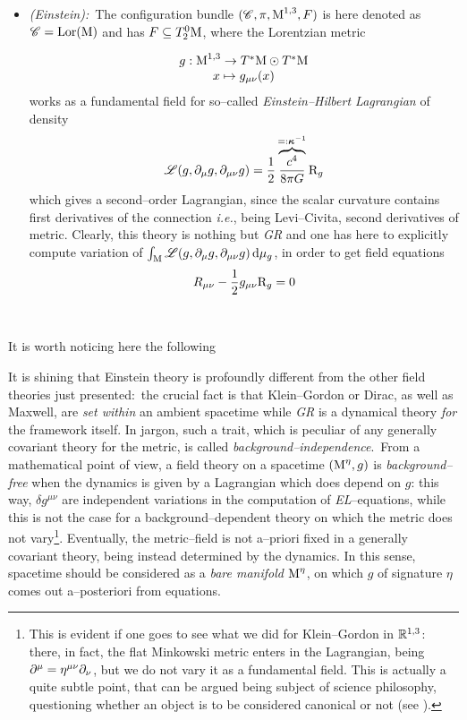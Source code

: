 \begin{example}
\begin{itemize}
        \item \emph{(Einstein):}\, The configuration bundle $(\mathscr{C},\pi,\text{\normalfont M}^{1,3},F)$ is here denoted as $\mathscr{C}=\text{\normalfont Lor}(\text{\normalfont M})$ and has $F\subseteq T^0_2\text{\normalfont M}$, where the Lorentzian metric

        $$\begin{matrix}
            g:\text{\normalfont M}^{1,3}\to T^*\text{\normalfont M}\odot T^*\text{\normalfont M}\\
            x\mapsto g_{\mu\nu}(x)
        \end{matrix}$$
        works as a fundamental field for so--called \emph{Einstein--Hilbert Lagrangian} of density
        $$\mathscr{L}(g,\partial_\mu g,\partial_{\mu\nu}g)=\frac{1}{2}\overbrace{\frac{c^4}{8\pi G}}^{=:\boldsymbol{\kappa}^{-1}}\text{\normalfont R}_g$$
        which gives a second--order Lagrangian, since the scalar curvature contains first derivatives of the connection \emph{i.e.}, being Levi--Civita, second derivatives of metric. Clearly, this theory is nothing but \emph{GR} and one has here to explicitly compute variation of $\int_{\text{\normalfont M}}\mathscr{L}(g,\partial_\mu g,\partial_{\mu\nu}g)\,\text{\normalfont d}\mu_g$, in order to get field equations
        $$R_{\mu\nu}-\frac{1}{2}g_{\mu\nu}\text{\normalfont R}_g=0$$
        
    \end{itemize}
    \,\newline
\end{example}

It is worth noticing here the following

\begin{remark}\label{bare}
    It is shining that Einstein theory is profoundly different from the other field theories just presented:\, the crucial fact is that Klein--Gordon or Dirac, as well as Maxwell, are \emph{set within} an ambient spacetime while \emph{GR} is a dynamical theory \emph{for} the framework itself. In jargon, such a trait, which is peculiar of any generally covariant theory for the metric, is called \emph{background--independence}.\, From a mathematical point of view, a field theory on a spacetime $(\text{\normalfont M}^\eta,g)$ is \emph{background--free} when the dynamics is given by a Lagrangian which does depend on $g$: this way, $\delta g^{\mu\nu}$ are independent variations in the computation of \emph{EL}--equations, while this is not the case for a background--dependent theory on which the metric does not vary\footnote{This is evident if one goes to see what we did for Klein--Gordon in $\mathbb{R}^{1,3}$: there, in fact, the flat Minkowski metric enters in the Lagrangian, being $\partial^\mu=\eta^{\mu\nu}\partial_{\nu}$, but we do not vary it as a fundamental field. This is actually a quite subtle point, that can be argued being subject of science philosophy, questioning whether an object is to be considered canonical or not (see \cite{giulini}).}. Eventually, the metric--field is not a--priori fixed in a generally covariant theory, being instead determined by the dynamics. In this sense, spacetime should be considered as a \emph{bare manifold} $\text{\normalfont M}^\eta$, on which $g$ of signature $\eta$ comes out a--posteriori from equations.
\end{remark}




